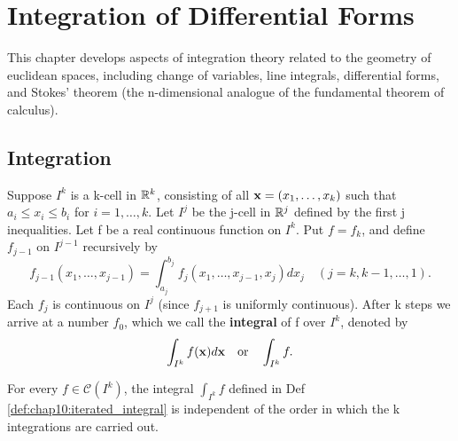 
\chapter{Integration of Differential Forms}
\label{chap:rudin10}

This chapter develops aspects of integration theory related to the
geometry of euclidean spaces, including change of variables, line
integrals, differential forms, and Stokes' theorem (the n-dimensional
analogue of the fundamental theorem of calculus).

\section{Integration}

\begin{definition}
  \label{def:chap10:iterated_integral}
  Suppose $I^k$ is a k-cell in $\mathbb{R}^k$, consisting of all
  $\mathbf{x}=(x_1, \dots, x_k)$ such that $a_i \le x_i \le b_i$ for
  $i=1, \dots, k$. Let $I^j$ be the j-cell in $\mathbb{R}^j$ defined by the
  first j inequalities. Let f be a real continuous function on $I^k$.
  Put $f=f_k$, and define $f_{j-1}$ on $I^{j-1}$ recursively by
  \[
    f_{j-1}(x_1, \dots, x_{j-1}) = \int_{a_j}^{b_j} f_j(x_1, \dots,
    x_{j-1}, x_j) dx_j \quad (j=k, k-1, \dots, 1).
  \]
  Each $f_j$ is continuous on $I^j$ (since $f_{j+1}$ is uniformly
  continuous). After k steps we arrive at a number $f_0$, which we
  call the \textbf{integral} of f over $I^k$, denoted by
  \[
    \int_{I^k} f(\mathbf{x}) d\mathbf{x} \quad \text{or} \quad \int_{I^k} f.
  \]
\end{definition}


\begin{theorem}
  \label{thm:chap10:integration_order_independent}
  For every $f \in \mathcal{C}(I^k)$, the integral $\int_{I^k} f$
  defined in Def \ref{def:chap10:iterated_integral} is independent of
  the order in which the k integrations are carried out.
\end{theorem}

